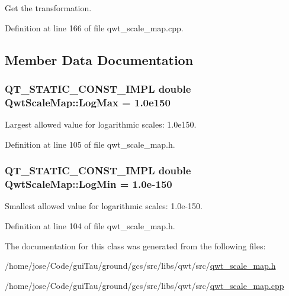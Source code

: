 Get the transformation. 



Definition at line 166 of file qwt\-\_\-scale\-\_\-map.\-cpp.



\subsection{Member Data Documentation}
\hypertarget{class_qwt_scale_map_a0f06d4698bcb8af2200e37609b4b88c4}{
\subsubsection[{Log\-Max}]{\setlength{\rightskip}{0pt plus 5cm}Q\-T\-\_\-\-S\-T\-A\-T\-I\-C\-\_\-\-C\-O\-N\-S\-T\-\_\-\-I\-M\-P\-L {\bf double} Qwt\-Scale\-Map\-::\-Log\-Max = 1.\-0e150}}\label{class_qwt_scale_map_a0f06d4698bcb8af2200e37609b4b88c4}


Largest allowed value for logarithmic scales\-: 1.\-0e150. 



Definition at line 105 of file qwt\-\_\-scale\-\_\-map.\-h.

\hypertarget{class_qwt_scale_map_adacf5fdb36940d39929993083f6cb64b}{
\subsubsection[{Log\-Min}]{\setlength{\rightskip}{0pt plus 5cm}Q\-T\-\_\-\-S\-T\-A\-T\-I\-C\-\_\-\-C\-O\-N\-S\-T\-\_\-\-I\-M\-P\-L {\bf double} Qwt\-Scale\-Map\-::\-Log\-Min = 1.\-0e-\/150}}\label{class_qwt_scale_map_adacf5fdb36940d39929993083f6cb64b}


Smallest allowed value for logarithmic scales\-: 1.\-0e-\/150. 



Definition at line 104 of file qwt\-\_\-scale\-\_\-map.\-h.



The documentation for this class was generated from the following files\-:\begin{DoxyCompactItemize}
\item 
/home/jose/\-Code/gui\-Tau/ground/gcs/src/libs/qwt/src/\hyperlink{qwt__scale__map_8h}{qwt\-\_\-scale\-\_\-map.\-h}\item 
/home/jose/\-Code/gui\-Tau/ground/gcs/src/libs/qwt/src/\hyperlink{qwt__scale__map_8cpp}{qwt\-\_\-scale\-\_\-map.\-cpp}\end{DoxyCompactItemize}

